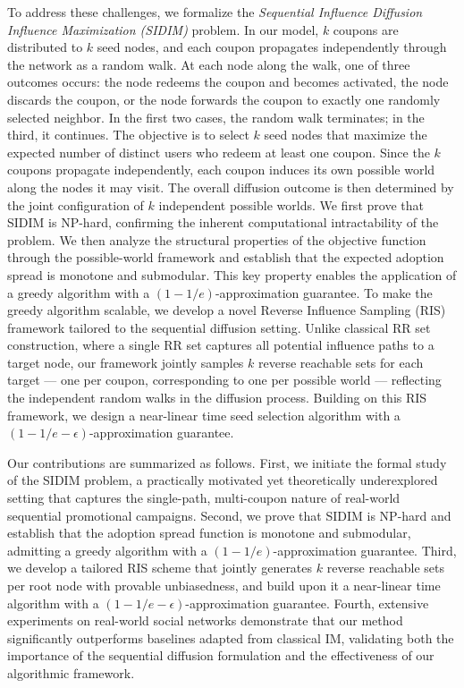 \documentclass{article}
\begin{document}
To address these challenges, we formalize the \emph{Sequential Influence Diffusion Influence Maximization (SIDIM)} problem. In our model, $k$ coupons are distributed to $k$ seed nodes, and each coupon propagates independently through the network as a random walk. At each node along the walk, one of three outcomes occurs: the node redeems the coupon and becomes activated, the node discards the coupon, or the node forwards the coupon to exactly one randomly selected neighbor. In the first two cases, the random walk terminates; in the third, it continues. The objective is to select $k$ seed nodes that maximize the expected number of distinct users who redeem at least one coupon. Since the $k$ coupons propagate independently, each coupon induces its own possible world along the nodes it may visit. The overall diffusion outcome is then determined by the joint configuration of $k$ independent possible worlds. We first prove that SIDIM is NP-hard, confirming the inherent computational intractability of the problem. We then analyze the structural properties of the objective function through the possible-world framework and establish that the expected adoption spread is monotone and submodular. This key property enables the application of a greedy algorithm with a $(1-1/e)$-approximation guarantee. To make the greedy algorithm scalable, we develop a novel Reverse Influence Sampling (RIS) framework tailored to the sequential diffusion setting. Unlike classical RR set construction, where a single RR set captures all potential influence paths to a target node, our framework jointly samples $k$ reverse reachable sets for each target --- one per coupon, corresponding to one per possible world --- reflecting the independent random walks in the diffusion process. Building on this RIS framework, we design a near-linear time seed selection algorithm with a $(1-1/e-\epsilon)$-approximation guarantee.

Our contributions are summarized as follows. First, we initiate the formal study of the SIDIM problem, a practically motivated yet theoretically underexplored setting that captures the single-path, multi-coupon nature of real-world sequential promotional campaigns. Second, we prove that SIDIM is NP-hard and establish that the adoption spread function is monotone and submodular, admitting a greedy algorithm with a $(1-1/e)$-approximation guarantee. Third, we develop a tailored RIS scheme that jointly generates $k$ reverse reachable sets per root node with provable unbiasedness, and build upon it a near-linear time algorithm with a $(1-1/e-\epsilon)$-approximation guarantee. Fourth, extensive experiments on real-world social networks demonstrate that our method significantly outperforms baselines adapted from classical IM, validating both the importance of the sequential diffusion formulation and the effectiveness of our algorithmic framework.
\end{document}
